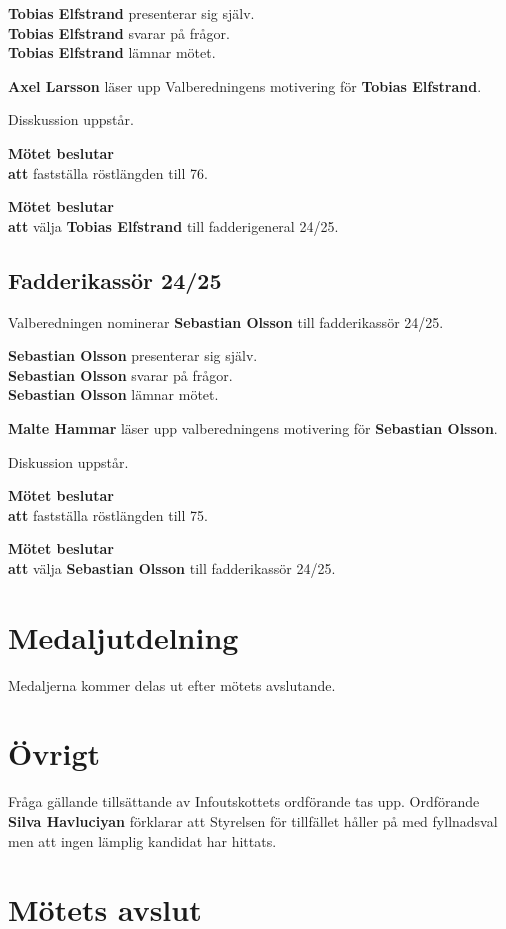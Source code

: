 \documentclass{datateknologsektionen-document}
\newcommand{\ind}{\hspace*{2em}}
\newcommand{\motetbeslutar}{\textbf{Mötet beslutar}}
\newcommand{\att}{\\\ind\textbf{att}}
\begin{document}
\textbf{Tobias Elfstrand} presenterar sig själv.\\
\textbf{Tobias Elfstrand} svarar på frågor.\\
\textbf{Tobias Elfstrand} lämnar mötet.

\textbf{Axel Larsson} läser upp Valberedningens motivering för \textbf{Tobias Elfstrand}.

Disskussion uppstår.

\motetbeslutar
\att{} fastställa röstlängden till 76.

\motetbeslutar
\att{} välja \textbf{Tobias Elfstrand} till fadderigeneral 24/25.

\subsection{Fadderikassör 24/25}
Valberedningen nominerar \textbf{Sebastian Olsson} till fadderikassör 24/25.

\textbf{Sebastian Olsson} presenterar sig själv.\\
\textbf{Sebastian Olsson} svarar på frågor.\\
\textbf{Sebastian Olsson} lämnar mötet.

\textbf{Malte Hammar} läser upp valberedningens motivering för \textbf{Sebastian Olsson}.

Diskussion uppstår.

\motetbeslutar
\att{} fastställa röstlängden till 75.

\motetbeslutar
\att{} välja \textbf{Sebastian Olsson} till fadderikassör 24/25.


\pagebreak

\section{Medaljutdelning}
Medaljerna kommer delas ut efter mötets avslutande.

\section{Övrigt}

Fråga gällande tillsättande av Infoutskottets ordförande tas upp. Ordförande \textbf{Silva Havluciyan} förklarar att Styrelsen för tillfället håller på med fyllnadsval men att ingen lämplig kandidat har hittats.


\section{Mötets avslut}
\end{document}
